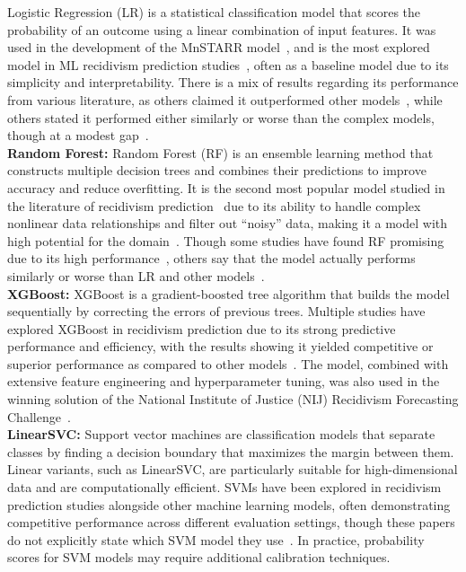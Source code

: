 \documentclass[12pt]{article}
\begin{document}
Logistic Regression (LR) is a statistical classification model that scores the probability of an outcome using a linear combination of input features. It was used in the development of the MnSTARR model~\cite{duwe2014development}, and is the most explored model in ML recidivism prediction studies~\cite{travaini2022machine}, often as a baseline model due to its simplicity and interpretability. There is a mix of results regarding its performance from various literature, as others claimed it outperformed other models~\cite{ngo2018traditional,karimi2021enhancing}, while others stated it performed either similarly or worse than the complex models, though at a modest gap~\cite{duwe2017out,kovalchuk2023prediction}.\\

\textbf{Random Forest:} Random Forest (RF) is an ensemble learning method that constructs multiple decision trees and combines their predictions to improve accuracy and reduce overfitting. It is the second most popular model studied in the literature of recidivism prediction~\cite{travaini2022machine} due to its ability to handle complex nonlinear data relationships and filter out ``noisy'' data, making it a model with high potential for the domain~\cite{tollenaar2013method,duwe2017out}. Though some studies have found RF promising due to its high performance~\cite{duwe2017out,kovalchuk2023prediction}, others say that the model actually performs similarly or worse than LR and other models~\cite{ozkan2017predicting,ngo2018traditional}. \\

\textbf{XGBoost:} XGBoost is a gradient-boosted tree algorithm that builds the model sequentially by correcting the errors of previous trees. Multiple studies have explored XGBoost in recidivism prediction due to its strong predictive performance and efficiency, with the results showing it yielded competitive or superior performance as compared to other models~\cite{won2019recidivism,rajendran2021predicting}. The model, combined with extensive feature engineering and hyperparameter tuning, was also used in the winning solution of the National Institute of Justice (NIJ) Recidivism Forecasting Challenge~\cite{han2022xgboost}. \\

\textbf{LinearSVC:} Support vector machines are classification models that separate classes by finding a decision boundary that maximizes the margin between them. Linear variants, such as LinearSVC, are particularly suitable for high-dimensional data and are computationally efficient. SVMs have been explored in recidivism prediction studies alongside other machine learning models, often demonstrating competitive performance across different evaluation settings, though these papers do not explicitly state which SVM model they use~\cite{duwe2017out, tolan2019machine,ozkan2017predicting}. In practice, probability scores for SVM models may require additional calibration techniques.
\end{document}
